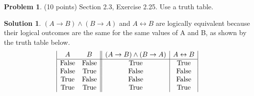 \documentclass{article}
\theoremstyle{definition}
\newtheorem{problem}{Problem}
\newtheorem*{solution}{Solution}
\begin{document}
\newpage
\begin{problem} (10 points) Section 2.3, Exercise 2.25.
Use a truth table.
\end{problem}
\begin{solution}
$(A \rightarrow B) \land (B \rightarrow A)$ and $A \leftrightarrow B$ are logically equivalent because their logical outcomes are the same for the same values of A and B, as shown by the truth table below.
\begin{displaymath}
\begin{array}{|c c||c|c|}
A & B & (A \rightarrow B) \land (B \rightarrow A) & A \leftrightarrow B \\
\hline
\text{False} & \text{False} & \text{True} & \text{True} \\
\text{False} & \text{True} & \text{False} & \text{False} \\
\text{True} & \text{False} & \text{False} & \text{False} \\
\text{True} & \text{True} & \text{True} & \text{True} \\
\end{array}
\end{displaymath}
    
\end{solution}
\end{document}
